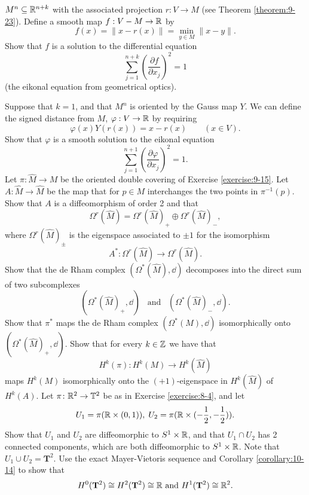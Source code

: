 \begin{enumerate}[label=\theexercise.\arabic*.,ref=\theexercise.\arabic*,leftmargin=2.7em]
    $M^n\subseteq {\ensuremath{\mathbb{R}}}^{n+k}$ with the associated projection $r:V\to M$ (see Theorem \ref{theorem:9-23}).
    Define a smooth map $f:V-M\to {\ensuremath{\mathbb{R}}}$ by
    \[
      f(x) = \|x-r(x)\| = \min_{y\in M}\|x-y\|.
    \]
    Show that $f$ is a solution to the differential equation
    \[
      \sum_{j=1}^{n+k }{\left(\frac{\partial f }{\partial x_j }\right)^2} = 1
    \]
    (the eikonal equation from geometrical optics).\par
    Suppose that $k = 1$, and that $M^n$ is oriented by the Gauss map $Y$. We can define the signed distance
    from $M$, $\varphi: V\to {\ensuremath{\mathbb{R}}}$ by requiring
    \[
      \varphi(x)Y(r(x)) = x-r(x)\qquad (x\in V).
    \]
    Show that $\varphi$ is a smooth solution to the eikonal equation
    \[
      \sum_{j=1}^{n+1}{\left(\frac{\partial \varphi }{\partial x_j }\right)^2} = 1.
    \]
  \NewItem Let $\pi:\hat{M}\to M$ be the oriented double covering of Exercise \ref{exercise:9-15}.
    Let $A:\hat M\to \hat M$ be the map that for $p\in M$ interchanges the two points in $\pi^{-1}(p)$. Show that $A$
    is a diffeomorphism of order 2 and that
    \[
      \Omega^r(\hat M) = \Omega^r(\hat M)_+\oplus \Omega^r(\hat M)_-,
    \]
    where $\Omega^r(\hat M)_{\pm}$ is the eigenspace associated to $\pm 1$ for the isomorphism
    \[
      A^*:\Omega^r(\hat M)\to\Omega^r(\hat M).
    \]
    Show that the de Rham complex $(\Omega^*(\hat M), \dd)$ decomposes into the direct sum of two subcomplexes
    \[
      (\Omega^*(\hat M)_+, \dd) \enspace\text{ and }\enspace (\Omega^*(\hat M)_-, \dd).
    \]
    Show that $\pi^*$ maps the de Rham complex $(\Omega^*(M), \dd)$ isomorphically onto $(\Omega^*(\hat M)_+, \dd)$.
    Show that for every $k\in{\ensuremath{\mathbb{Z}}}$ we have that
    \[
      H^k(\pi):H^k(M)\to H^k(\hat M)
    \]
    maps $H^k(M)$ isomorphically onto the $(+1)$-eigenspace in $H^k(\hat M)$ of $H^k(A)$.
  \newchap[10]
  \NewItem Let $\pi\colon  {\ensuremath{\mathbb{R}}}^{2} \rightarrow  {\ensuremath{\mathbb{T}}}^{2}$ be as in Exercise \ref{exercise:8-4}, and let
    \[
      {U}_{1} = \pi ( {\mathbb{R} \times  ( {0,1}) }),\;{U}_{2} = \pi ( {\mathbb{R} \times  ( {-\frac{1}{2},- \frac{1}{2}}) }).
    \]
    Show that ${U}_{1}$ and ${U}_{2}$ are diffeomorphic to ${S}^{1} \times  \mathbb{R}$, and that ${U}_{1} \cap  {U}_{2}$ has 2 connected components, which are both diffeomorphic to ${S}^{1} \times  \mathbb{R}$. Note that ${U}_{1} \cup  {U}_{2} = {\mathbf{T}}^{2}$.
    Use the exact Mayer-Vietoris sequence and Corollary \ref{corollary:10-14} to show that
    \[
      {H}^{0}( {\mathbf{T}}^{2})  \cong  {H}^{2}( {\mathbf{T}}^{2})  \cong  \mathbb{R}\text{ and }{H}^{1}( {\mathbf{T}}^{2})  \cong  {\ensuremath{\mathbb{R}}}^{2}.
\]
\end{enumerate}
